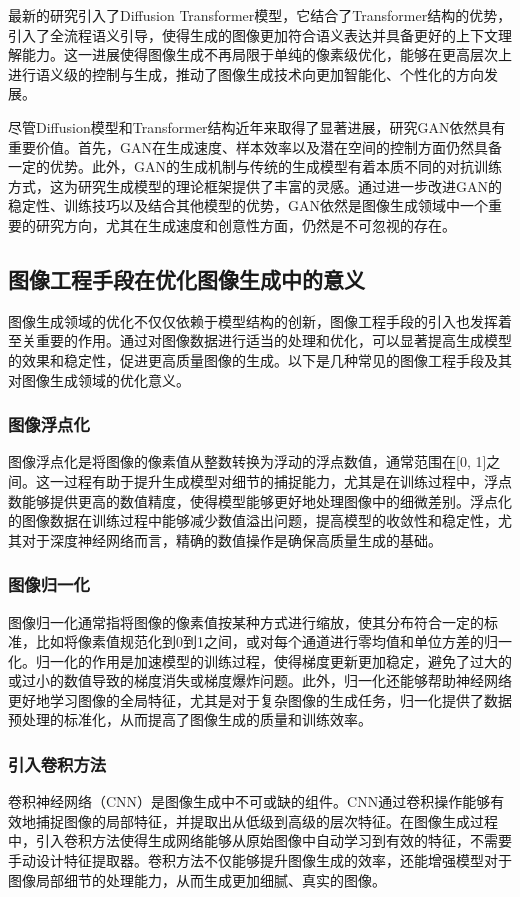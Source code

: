 \documentclass[UTF8]{ctexart}
\begin{document}
最新的研究引入了Diffusion Transformer模型，它结合了Transformer结构的优势，引入了全流程语义引导，使得生成的图像更加符合语义表达并具备更好的上下文理解能力。这一进展使得图像生成不再局限于单纯的像素级优化，能够在更高层次上进行语义级的控制与生成，推动了图像生成技术向更加智能化、个性化的方向发展。\par
尽管Diffusion模型和Transformer结构近年来取得了显著进展，研究GAN依然具有重要价值。首先，GAN在生成速度、样本效率以及潜在空间的控制方面仍然具备一定的优势。此外，GAN的生成机制与传统的生成模型有着本质不同的对抗训练方式，这为研究生成模型的理论框架提供了丰富的灵感。通过进一步改进GAN的稳定性、训练技巧以及结合其他模型的优势，GAN依然是图像生成领域中一个重要的研究方向，尤其在生成速度和创意性方面，仍然是不可忽视的存在。
\subsection{图像工程手段在优化图像生成中的意义}
图像生成领域的优化不仅仅依赖于模型结构的创新，图像工程手段的引入也发挥着至关重要的作用。通过对图像数据进行适当的处理和优化，可以显著提高生成模型的效果和稳定性，促进更高质量图像的生成。以下是几种常见的图像工程手段及其对图像生成领域的优化意义。
\subsubsection{图像浮点化}
图像浮点化是将图像的像素值从整数转换为浮动的浮点数值，通常范围在[0, 1]之间。这一过程有助于提升生成模型对细节的捕捉能力，尤其是在训练过程中，浮点数能够提供更高的数值精度，使得模型能够更好地处理图像中的细微差别。浮点化的图像数据在训练过程中能够减少数值溢出问题，提高模型的收敛性和稳定性，尤其对于深度神经网络而言，精确的数值操作是确保高质量生成的基础。
\subsubsection{图像归一化}
图像归一化通常指将图像的像素值按某种方式进行缩放，使其分布符合一定的标准，比如将像素值规范化到0到1之间，或对每个通道进行零均值和单位方差的归一化。归一化的作用是加速模型的训练过程，使得梯度更新更加稳定，避免了过大的或过小的数值导致的梯度消失或梯度爆炸问题。此外，归一化还能够帮助神经网络更好地学习图像的全局特征，尤其是对于复杂图像的生成任务，归一化提供了数据预处理的标准化，从而提高了图像生成的质量和训练效率。
\subsubsection{引入卷积方法}
卷积神经网络（CNN）是图像生成中不可或缺的组件。CNN通过卷积操作能够有效地捕捉图像的局部特征，并提取出从低级到高级的层次特征。在图像生成过程中，引入卷积方法使得生成网络能够从原始图像中自动学习到有效的特征，不需要手动设计特征提取器。卷积方法不仅能够提升图像生成的效率，还能增强模型对于图像局部细节的处理能力，从而生成更加细腻、真实的图像。
\end{document}

